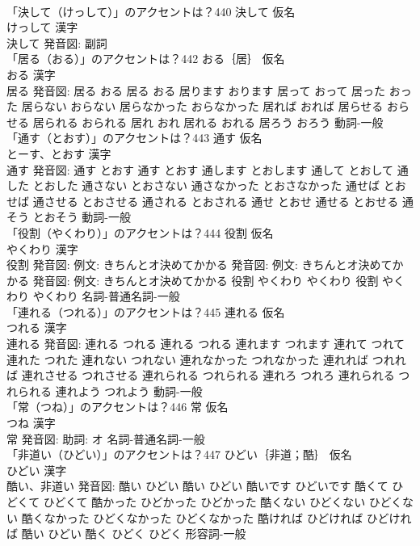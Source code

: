 \documentclass[8pt]{extreport}
\begin{document}
\begin{CJK}{UTF8}{min}
\\	「決して（けっして）」のアクセントは？440	決して 仮名　
\\	けっして 漢字　
\\	決して 発音図:							副詞 
\\	「居る（おる）」のアクセントは？442	おる｛居｝ 仮名　
\\	おる 漢字　
\\	居る 発音図:	居る おる		居る おる 居ります おります 居って おって 居った おった 居らない おらない 居らなかった おらなかった 居れば おれば 居らせる おらせる 居られる おられる 居れ おれ 居れる おれる 居ろう おろう				動詞-一般 
\\	「通す（とおす）」のアクセントは？443	通す 仮名　
\\	とーす、とおす 漢字　
\\	通す 発音図:	通す とおす		通す とおす 通します とおします 通して とおして 通した とおした 通さない とおさない 通さなかった とおさなかった 通せば とおせば 通させる とおさせる 通される とおされる 通せ とおせ 通せる とおせる 通そう とおそう				動詞-一般 
\\	「役割（やくわり）」のアクセントは？444	役割 仮名　
\\	やくわり 漢字　
\\	役割 発音図: 例文: きちんとオ決めてかかる 発音図: 例文: きちんとオ決めてかかる 発音図: 例文: きちんとオ決めてかかる	役割 やくわり やくわり		役割 やくわり やくわり				名詞-普通名詞-一般 
\\	「連れる（つれる）」のアクセントは？445	連れる 仮名　
\\	つれる 漢字　
\\	連れる 発音図:	連れる つれる		連れる つれる 連れます つれます 連れて つれて 連れた つれた 連れない つれない 連れなかった つれなかった 連れれば つれれば 連れさせる つれさせる 連れられる つれられる 連れろ つれろ 連れられる つれられる 連れよう つれよう				動詞-一般 
\\	「常（つね）」のアクセントは？446	常 仮名　
\\	つね 漢字　
\\	常 発音図: 助詞: オ							名詞-普通名詞-一般 
\\	「非道い（ひどい）」のアクセントは？447	ひどい｛非道；酷｝ 仮名　
\\	ひどい 漢字　
\\	酷い、非道い 発音図:	酷い ひどい		酷い ひどい 酷いです ひどいです 酷くて ひどくて ひどくて 酷かった ひどかった ひどかった 酷くない ひどくない ひどくない 酷くなかった ひどくなかった ひどくなかった 酷ければ ひどければ ひどければ 酷い ひどい 酷く ひどく ひどく				形容詞-一般 

\end{CJK}
\end{document}
